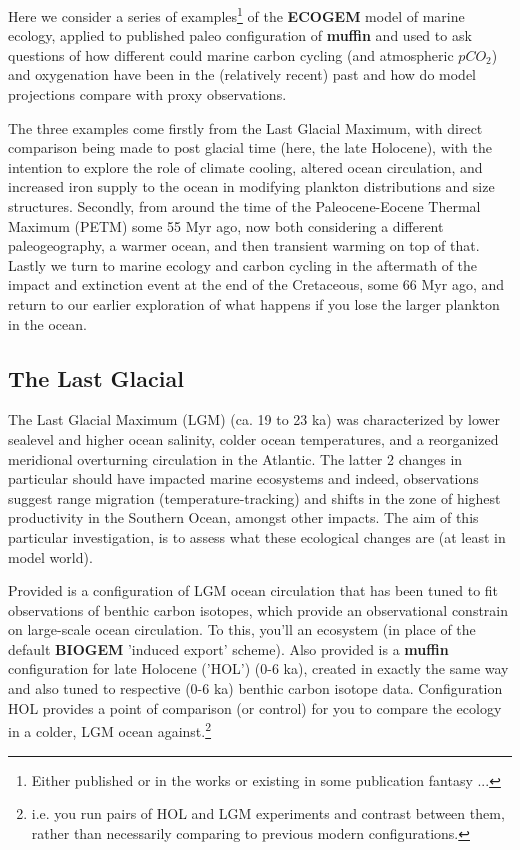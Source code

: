 \documentclass[11pt,fleqn]{book} %
\begin{document}
Here we consider a series of examples\footnote{Either published or in the works or existing in some publication fantasy ...} of the \textbf{ECOGEM} model of marine ecology, applied to published paleo configuration of \textbf{muffin} and used to ask questions of how different could marine carbon cycling (and atmospheric \(pCO_{2}\)) and oxygenation have been in the (relatively recent) past and how do model projections compare with proxy observations.

The three examples come firstly from the Last Glacial Maximum, with direct comparison being made to post glacial time (here, the late Holocene), with the intention to explore the role of climate cooling, altered ocean circulation, and increased iron supply to the ocean in modifying plankton distributions and size structures. Secondly, from around the time of the Paleocene-Eocene Thermal Maximum (PETM) some 55 Myr ago, now both considering a different paleogeography, a warmer ocean, and then transient warming on top of that. Lastly we turn to marine ecology and carbon cycling in the aftermath of the impact and extinction event at the end of the Cretaceous, some 66 Myr ago, and return to our earlier exploration of what happens if you lose the larger plankton in the ocean.

\newpage
\subsection*{The Last Glacial}

The Last Glacial Maximum (LGM) (ca. 19 to 23 ka) was characterized by lower sealevel and higher ocean salinity, colder ocean temperatures, and a reorganized meridional overturning circulation in the Atlantic. The latter 2 changes in particular should have impacted marine ecosystems and indeed, observations suggest range migration (temperature-tracking) and shifts in the zone of highest productivity in the Southern Ocean, amongst other impacts. The aim of this particular investigation, is to assess what these ecological changes are (at least in model world).

Provided is a configuration of LGM ocean circulation that has been tuned to fit observations of benthic carbon isotopes, which provide an observational constrain on large-scale ocean circulation. To this, you'll an ecosystem (in place of the default \textbf{BIOGEM} 'induced export' scheme). Also provided is a \textbf{muffin} configuration for late Holocene ('HOL') (0-6 ka), created in exactly the same way and also tuned to respective (0-6 ka) benthic carbon isotope data. Configuration HOL provides a point of comparison (or control) for you to compare the ecology in a colder, LGM ocean against.\footnote{i.e. you run pairs of HOL and LGM experiments and contrast between them, rather than necessarily comparing to previous modern configurations.}
\end{document}
